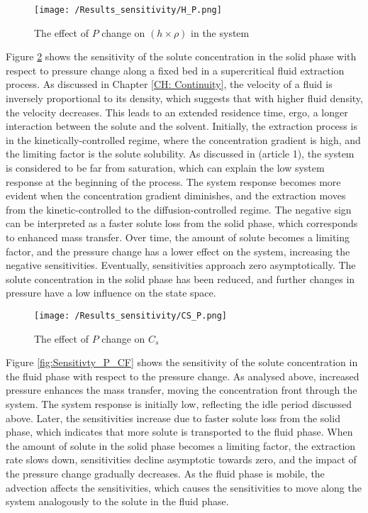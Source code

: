 \documentclass[../Article_Sensitivity_Analsysis.tex]{subfiles}
\begin{document}
	\begin{figure}[h!]
		\centering
		\texttt{[image: /Results\_sensitivity/H\_P.png]}
		\caption{The effect of $P$ change on $(h \times \rho)$ in the system}
		\label{fig:Sensitivty_P_H}
	\end{figure}
	
	Figure \ref{fig:Sensitivty_P_CS} shows the sensitivity of the solute concentration in the solid phase with respect to pressure change along a fixed bed in a supercritical fluid extraction process. As discussed in Chapter \ref{CH: Continuity}, the velocity of a fluid is inversely proportional to its density, which suggests that with higher fluid density, the velocity decreases. This leads to an extended residence time, ergo, a longer interaction between the solute and the solvent. Initially, the extraction process is in the kinetically-controlled regime, where the concentration gradient is high, and the limiting factor is the solute solubility. As discussed in ({\color{red}article 1}), the system is considered to be far from saturation, which can explain the low system response at the beginning of the process. The system response becomes more evident when the concentration gradient diminishes, and the extraction moves from the kinetic-controlled to the diffusion-controlled regime. The negative sign can be interpreted as a faster solute loss from the solid phase, which corresponds to enhanced mass transfer. Over time, the amount of solute becomes a limiting factor, and the pressure change has a lower effect on the system, increasing the negative sensitivities. Eventually, sensitivities approach zero asymptotically. The solute concentration in the solid phase has been reduced, and further changes in pressure have a low influence on the state space.

	\begin{figure}[!ht]
		\centering
		\texttt{[image: /Results\_sensitivity/CS\_P.png]}
		\caption{The effect of $P$ change on $C_s$}
		\label{fig:Sensitivty_P_CS}
	\end{figure}
	
	Figure \ref{fig:Sensitivty_P_CF} shows the sensitivity of the solute concentration in the fluid phase with respect to the pressure change. As analysed above, increased pressure enhances the mass transfer, moving the concentration front through the system. The system response is initially low, reflecting the idle period discussed above. Later, the sensitivities increase due to faster solute loss from the solid phase, which indicates that more solute is transported to the fluid phase. When the amount of solute in the solid phase becomes a limiting factor, the extraction rate slows down, sensitivities decline asymptotic towards zero, and the impact of the pressure change gradually decreases. As the fluid phase is mobile, the advection affects the sensitivities, which causes the sensitivities to move along the system analogously to the solute in the fluid phase.
	
\end{document}

